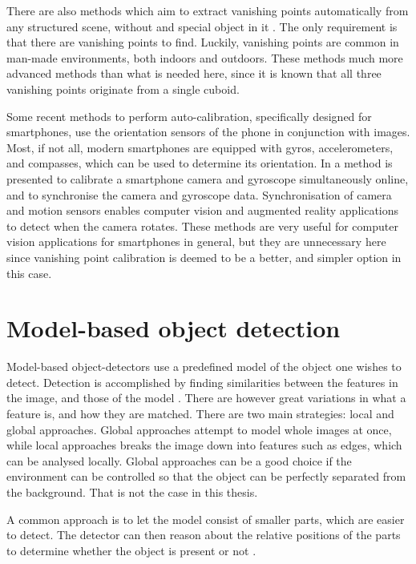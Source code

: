 There are also methods which aim to extract vanishing points automatically from any structured scene, without and special object in it \cite{cipolla1999camera} \cite{grammatikopoulos2007automatic}.
The only requirement is that there are vanishing points to find.
Luckily, vanishing points are common in man-made environments, both indoors and outdoors.
These methods much more advanced methods than what is needed here, since it is known that all three vanishing points originate from a single cuboid.

Some recent methods to perform auto-calibration, specifically designed for smartphones, use the orientation sensors of the phone in conjunction with images.
Most, if not all, modern  smartphones are equipped with gyros, accelerometers, and compasses, which can be used to determine its orientation.
In \cite{jia2014online} a method is presented to calibrate a smartphone camera and gyroscope simultaneously online, and to synchronise the camera and gyroscope data.
Synchronisation of camera and motion sensors enables computer vision and augmented reality applications to detect when the camera rotates.
These methods are very useful for computer vision applications for smartphones in general, but they are unnecessary here since vanishing point calibration is deemed to be a better, and simpler option in this case.

\section{Model-based object detection} \label{related_work:object_detection}
Model-based object-detectors use a predefined model of the object one wishes to detect.
Detection is accomplished by finding similarities between the features in the image, and those of the model \cite{pope1994model}.
There are however great variations in what a feature is, and how they are matched.
There are two main strategies: local and global approaches.
Global approaches attempt to model whole images at once, while local approaches breaks the image down into features such as edges, which can be analysed locally.
Global approaches can be a good choice if the environment can be controlled so that the object can be perfectly separated from the background.
That is not the case in this thesis.

A common approach is to let the model consist of smaller parts, which are easier to detect.
The detector can then reason about the relative positions of the parts to determine whether the object is present or not \cite{chin1986model}.

